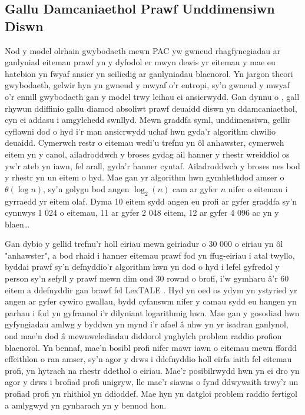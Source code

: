 \subsection{Gallu Damcaniaethol Prawf Unddimensiwn Diswn}
Nod y model olrhain gwybodaeth mewn PAC yw gwneud rhagfynegiadau ar ganlyniad eitemau prawf yn y dyfodol er mwyn dewis yr eitemau y mae eu hatebion yn fwyaf ansicr yn seiliedig ar ganlyniadau blaenorol. Yn jargon theori gwybodaeth, gelwir hyn yn gwneud y mwyaf o'r entropi, sy'n gwneud y mwyaf o'r ennill gwybodaeth gan y model trwy leihau ei ansicrwydd. Gan dynnu o \textcite{shannon_mathematical_1948}, gall rhywun ddiffinio gallu diamod absoliwt prawf deuaidd diswn yn ddamcaniaethol, cyn ei addasu i amgylchedd swnllyd. Mewn graddfa syml, unddimensiwn, gellir cyflawni dod o hyd i'r man ansicrwydd uchaf hwn gyda'r algorithm chwilio deuaidd. Cymerwch restr o eitemau wedi'u trefnu yn ôl anhawster, cymerwch eitem yn y canol, ailadroddwch y broses gydag ail hanner y rhestr wreiddiol os yw'r ateb yn iawn, fel arall, gyda'r hanner cyntaf. Ailadroddwch y broses nes bod y rhestr yn un eitem o hyd. Mae gan yr algorithm hwn gymhlethdod amser o $\theta(\log{n})$, sy'n golygu bod angen $\log_2(n)$ cam ar gyfer $n$ nifer o eitemau i gyrraedd yr eitem olaf. Dyma 10 eitem sydd angen eu profi ar gyfer graddfa sy'n cynnwys 1 024 o eitemau, 11 ar gyfer 2 048 eitem, 12 ar gyfer 4 096 ac yn y blaen\ldots

Gan dybio y gellid trefnu'r holl eiriau mewn geiriadur o 30 000 o eiriau yn ôl "anhawster", a bod rhaid i hanner eitemau prawf fod yn ffug-eiriau i atal twyllo, byddai prawf sy'n defnyddio'r algorithm hwn yn dod o hyd i lefel gyfredol y person sy'n sefyll y prawf mewn dim ond 30 rownd o brofi, i'w gymharu â'r 60 eitem a ddefnyddir gan brawf fel LexTALE \parencite{lemhofer_introducing_2012}. Hyd yn oed os ydym yn ystyried yr angen ar gyfer cywiro gwallau, bydd cyfanswm nifer y camau sydd eu hangen yn parhau i fod yn gyfrannol i'r dilyniant logarithmig hwn. Mae gan y gosodiad hwn gyfyngiadau amlwg y byddwn yn mynd i'r afael â nhw yn yr isadran ganlynol, ond mae'n dod â mewnwelediadau diddorol ynghylch problem raddio profion blaenorol. Yn bennaf, mae'n bosibl profi nifer mawr iawn o eitemau mewn ffordd effeithlon o ran amser, sy'n agor y drws i ddefnyddio holl eirfa iaith fel eitemau profi, yn hytrach na rhestr ddethol o eiriau. Mae'r posibilrwydd hwn yn ei dro yn agor y drws i brofiad profi unigryw, lle mae'r siawns o fynd ddwywaith trwy'r un profiad profi yn rhithiol yn ddioddef. Mae hyn yn datgloi problem raddio fertigol a amlygwyd yn gynharach yn y bennod hon.

